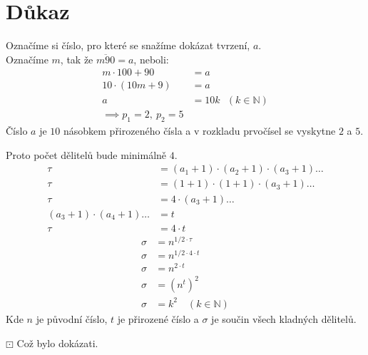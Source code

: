 \documentclass{MO}
\begin{document}
\section*{Důkaz}
Označíme si číslo, pro které se snažíme dokázat tvrzení, $a$. \\
Označíme $m$, tak že $\overline{m90}=a$, neboli:
\begin{align*}
    m \cdot 100 + 90 &= a \\
    10 \cdot (10m + 9) &= a \\
    a &= 10k\ \ \ (k \in \mathbb{N}) \\
    \implies p_1 = 2,\ p_2 = 5
\end{align*}
Číslo $a$ je $10$ násobkem přirozeného čísla a v rozkladu prvočísel se vyskytne $2$ a $5$.

Proto počet dělitelů bude minimálně $4$.
\begin{align*}
    \tau &= (a_1 + 1) \cdot (a_2 + 1) \cdot (a_3 + 1) \dots \\
    \tau &= (1 + 1) \cdot (1 + 1) \cdot (a_3 + 1) \dots \\
    \tau &= 4 \cdot (a_3 + 1) \dots \\
    (a_3 + 1) \cdot (a_4 + 1) \dots &= t \\
    \tau &= 4 \cdot t
\end{align*}
\begin{align*}
    \sigma &= n^{1/2 \cdot \tau} \\
    \sigma &= n^{1/2 \cdot 4 \cdot t} \\
    \sigma &= n^{2 \cdot t} \\
    \sigma &= (n^t)^2 \\
    \sigma &= k^2 \quad (k \in \mathbb{N})
\end{align*}
Kde $n$ je původní číslo, $t$ je přirozené číslo a $\sigma$ je součin všech kladných dělitelů.

\vspace{1cm}
\raggedleft
$\boxdot$ Což bylo dokázati.
\end{document}
